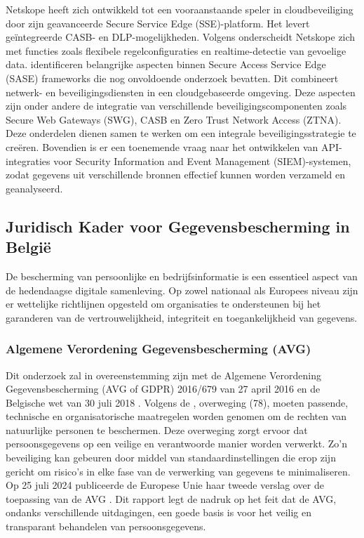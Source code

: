 Netskope heeft zich ontwikkeld tot een vooraanstaande speler in cloudbeveiliging door zijn geavanceerde Secure Service Edge (SSE)-platform. Het levert geïntegreerde CASB- en DLP-mogelijkheden. Volgens \textcite{Riley2018} onderscheidt Netskope zich met functies zoals flexibele regelconfiguraties en realtime-detectie van gevoelige data. \textcite{VanDerWalt2022} identificeren belangrijke aspecten binnen Secure Access Service Edge (SASE) frameworks die nog onvoldoende onderzoek bevatten. Dit combineert netwerk- en beveiligingsdiensten in een cloudgebaseerde omgeving. Deze aspecten zijn onder andere de integratie van verschillende beveiligingscomponenten zoals Secure Web Gateways (SWG), CASB en Zero Trust Network Access (ZTNA). Deze onderdelen dienen samen te werken om een integrale beveiligingsstrategie te creëren. Bovendien is er een toenemende vraag naar het ontwikkelen van API-integraties voor Security Information and Event Management (SIEM)-systemen, zodat gegevens uit verschillende bronnen effectief kunnen worden verzameld en geanalyseerd.
\subsection{Juridisch Kader voor Gegevensbescherming in België}%

De bescherming van persoonlijke en bedrijfsinformatie is een essentieel aspect van de hedendaagse digitale samenleving. Op zowel nationaal als Europees niveau zijn er wettelijke richtlijnen opgesteld om organisaties te ondersteunen bij het garanderen van de vertrouwelijkheid, integriteit en toegankelijkheid van gegevens.

\subsubsection{Algemene Verordening Gegevensbescherming (AVG)}%

Dit onderzoek zal in overeenstemming zijn met de Algemene Verordening Gegevensbescherming (AVG of GDPR) 2016/679 van 27 april 2016 \autocite{eu_avg2016} en de Belgische wet van 30 juli 2018 \autocite{wet_bescherming_2018}.
Volgens de \textcite{eu_avg2016}, overweging (78), moeten passende, technische en organisatorische maatregelen worden genomen om de rechten van natuurlijke personen te beschermen. Deze overweging zorgt ervoor dat persoonsgegevens op een veilige en verantwoorde manier worden verwerkt. Zo'n beveiliging kan gebeuren door middel van standaardinstellingen die erop zijn gericht om risico's in elke fase van de verwerking van gegevens te minimaliseren.
Op 25 juli 2024 publiceerde de Europese Unie haar tweede verslag over de toepassing van de AVG \autocite{eu_avg2024}. Dit rapport legt de nadruk op het feit dat de AVG, ondanks verschillende uitdagingen, een goede basis is voor het veilig en transparant behandelen van persoonsgegevens. 


